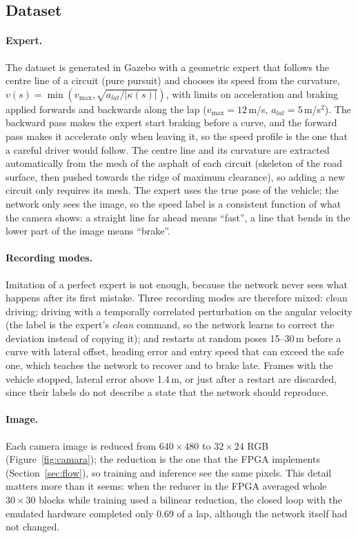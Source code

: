 \documentclass{article}
\begin{document}
\subsection{Dataset}
\paragraph{Expert.}
The dataset is generated in Gazebo with a geometric expert that follows the centre line of a circuit (pure pursuit) and chooses its
speed from the curvature, $v(s)=\min(v_{\max},\sqrt{a_{lat}/|\kappa(s)|})$, with limits on acceleration and braking applied forwards and
backwards along the lap ($v_{\max}=12$\,m/s, $a_{lat}=5$\,m/s$^2$). The backward pass makes the expert start braking before a curve, and the forward pass
makes it accelerate only when leaving it, so the speed profile is the one that a careful driver would follow. The centre line and its curvature are extracted automatically
from the mesh of the asphalt of each circuit (skeleton of the road surface, then pushed towards the ridge of maximum clearance), so adding a new circuit only requires its mesh.
The expert uses the true pose of the vehicle; the network only sees the image,
so the speed label is a consistent function of what the camera shows: a straight line far ahead means ``fast'', a line that bends in the lower part of the image means ``brake''.

\paragraph{Recording modes.}
Imitation of a perfect expert is not enough, because the network never sees what happens after its first mistake. Three recording modes are therefore mixed: clean driving;
driving with a temporally correlated perturbation on the angular velocity (the label is the expert's \emph{clean} command, so the network learns to correct the deviation
instead of copying it); and restarts at random
poses 15--30\,m before a curve with lateral offset, heading error and entry speed that can exceed the safe one, which teaches the network to recover and to brake late.
Frames with the vehicle stopped, lateral error above 1.4\,m, or just after a restart are discarded, since their labels do not describe a state that the network
should reproduce.

\paragraph{Image.}
Each camera image is reduced from $640{\times}480$ to $32{\times}24$ RGB (Figure~\ref{fig:camara}); the reduction is the one that the FPGA implements (Section~\ref{sec:flow}),
so training and inference see the same pixels. This detail matters more than it seems: when the reducer in the FPGA averaged whole $30{\times}30$ blocks while training used a
bilinear reduction, the closed loop with the emulated hardware completed only 0.69 of a lap, although the network itself had not changed.
\end{document}
